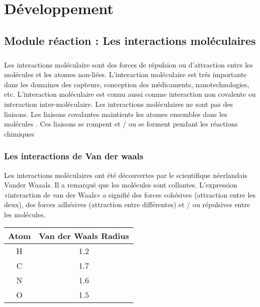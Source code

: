 
\chapter{Développement}
\label{developpement}

\section{Module réaction : Les interactions moléculaires}

\paragraph{}
Les interactions moléculaire sont des forces de répulsion ou d'attraction entre les molécules et les atomes non-liées. L'interaction moléculaire est trés importante dans les domaines des capteurs, conception des médicaments, nanotechnologies, etc. L'interaction moléculaire est connu aussi comme interaction non covalente ou interaction inter-moléculaire. Les interactions moléculaires ne sont pas des liaisons. Les liaisons covalantes  maintients les atomes ensembles dans les molécules . Ces liaisons se rompent et / ou se forment pendant les réactions chimiques 


\subsection{Les interactions de Van der waals}
Les interactions moléculaires ont été découvertes par le scientifique néerlandais Vander Waaals. Il a remarqué que les molécules sont collantes.
L'expression «interaction de van der Waals» a signifié des forces cohésives (attraction entre les deux), des forces adhésives (attraction entre différentes) et / ou répulsives entre les molécules.

\begin{table}[h!]
\centering
 \begin{tabular}{||c | c||} 
 \hline
 Atom & Van der Waals Radius \\ [0.5ex] 
 \hline\hline
 H & 1.2 \\ 
 \hline
 C & 1.7 \\
 \hline
 N & 1.6 \\
 \hline
 O & 1.5 \\
 \hline
 \end{tabular}
\end{table}
